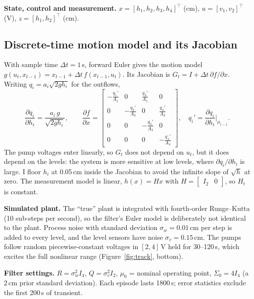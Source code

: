 \documentclass[11pt]{article}
\begin{document}
\textbf{State, control and measurement.} $x=[h_1,h_2,h_3,h_4]^\top$ (cm), $u=[v_1,v_2]^\top$ (V), $z=[h_1,h_2]^\top$ (cm).

\subsection{Discrete-time motion model and its Jacobian}
With sample time $\Delta t=1$\,s, forward Euler gives the motion model $g(u_t,x_{t-1})=x_{t-1}+\Delta t\,f(x_{t-1},u_t)$. Its Jacobian is $G_t=I+\Delta t\,\partial f/\partial x$. Writing $q_i=a_i\sqrt{2gh_i}$ for the outflows,
\begin{equation}
\frac{\partial q_i}{\partial h_i}=\frac{a_i\,g}{\sqrt{2gh_i}},\qquad
\frac{\partial f}{\partial x}=\begin{bmatrix}
-\frac{q_1'}{A_1}&0&\frac{q_3'}{A_1}&0\\
0&-\frac{q_2'}{A_2}&0&\frac{q_4'}{A_2}\\
0&0&-\frac{q_3'}{A_3}&0\\
0&0&0&-\frac{q_4'}{A_4}
\end{bmatrix},\quad q_i'=\frac{\partial q_i}{\partial h_i}\Big|_{\mu_{t-1}} .
\end{equation}
The pump voltages enter linearly, so $G_t$ does not depend on $u_t$, but it does depend on the levels: the system is more sensitive at low levels, where $\partial q_i/\partial h_i$ is large. I floor $h_i$ at 0.05\,cm inside the Jacobian to avoid the infinite slope of $\sqrt h$ at zero. The measurement model is linear, $h(x)=Hx$ with $H=\begin{bmatrix}I_2 & 0\end{bmatrix}$, so $H_t$ is constant.

\textbf{Simulated plant.} The ``true'' plant is integrated with fourth-order Runge--Kutta (10 sub-steps per second), so the filter's Euler model is deliberately not identical to the plant. Process noise with standard deviation $\sigma_w=0.01$\,cm per step is added to every level, and the level sensors have noise $\sigma_v=0.15$\,cm. The pumps follow random piecewise-constant voltages in $[2,4]$\,V held for 30--120\,s, which excites the full nonlinear range (Figure~\ref{fig:track}, bottom).

\textbf{Filter settings.} $R=\sigma_w^2I_4$, $Q=\sigma_v^2I_2$, $\mu_0$ = nominal operating point, $\Sigma_0=4I_4$ (a 2\,cm prior standard deviation). Each episode lasts 1800\,s; error statistics exclude the first 200\,s of transient.
\end{document}
